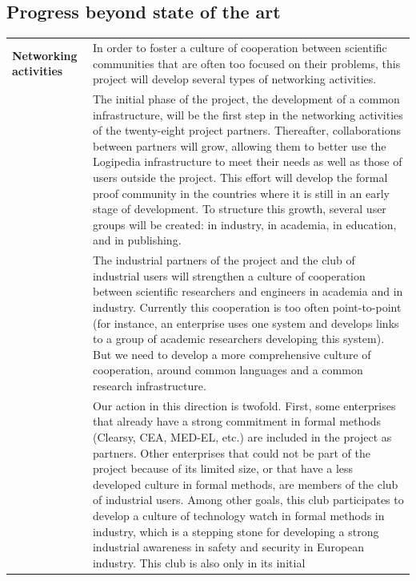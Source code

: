 \subsection*{Progress beyond state of the art}

\begin{longtable}{|p{}|p{}|}
\hline
{\bf Networking activities}
&
In order to foster a culture of cooperation between scientific
communities that are often too focused on their problems, this project
will develop several types of networking activities.\\
&
\hspace{0.4cm}
The initial phase of the project, the development of a common
infrastructure, will be the first step in the networking activities of
the twenty-eight project partners. Thereafter, collaborations between
partners will grow, allowing them to better use the Logipedia
infrastructure to meet their needs as well as those of users outside
the project. This effort will develop the formal proof community in
the countries where it is still in an early stage of development.  To
structure this growth, several user groups will be created: 
in industry, in academia, in education, and in publishing.\\
&
\hspace{0.4cm}
The industrial partners of the project
and the club of industrial users 
will strengthen a culture of cooperation between scientific
researchers and engineers in academia and in industry. Currently this
cooperation is too often point-to-point (for instance, an enterprise uses
one system and develops links to a group of academic researchers
developing this system). But we need to develop a more comprehensive
culture of cooperation, around common languages and a common research
infrastructure.\\
&
\hspace{0.4cm} Our action in this direction is twofold. First, some
enterprises that already have a strong commitment in formal methods
(Clearsy, CEA, MED-EL, etc.) are included in the project as
partners. Other enterprises that could not be part of the project
because of its limited size, or that have a less developed culture in
formal methods, are members of the club of industrial users. Among
other goals, this club participates to develop a culture of
technology watch in formal methods in industry, which is a stepping
stone for developing a strong industrial awareness in safety and
security in European industry. This club is also only in its initial

\end{longtable}
